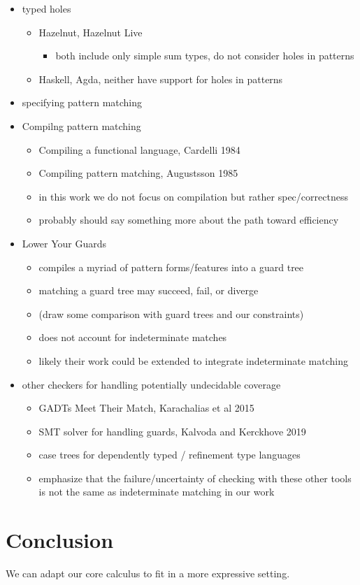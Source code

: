\documentclass[runningheads,envcountsame,a4paper]{llncs}
\begin{document}
\begin{itemize}
    \item typed holes
    \begin{itemize}
        \item Hazelnut, Hazelnut Live
        \begin{itemize}
            \item both include only simple sum types, do not consider holes in patterns
        \end{itemize}
        \item Haskell, Agda, neither have support for holes in patterns
    \end{itemize}
    \item specifying pattern matching
    \item Compilng pattern matching
    \begin{itemize}
        \item Compiling a functional language, Cardelli 1984
        \item Compiling pattern matching, Augustsson 1985
        \item in this work we do not focus on compilation but rather
        spec/correctness
        \item probably should say something more about the path toward
        efficiency
    \end{itemize}
    \item Lower Your Guards
    \begin{itemize}
        \item compiles a myriad of pattern forms/features into a guard tree
        \item matching a guard tree may succeed, fail, or diverge
        \item (draw some comparison with guard trees and our constraints)
        \item does not account for indeterminate matches
        \item likely their work could be extended to integrate indeterminate matching
    \end{itemize}
    \item other checkers for handling potentially undecidable coverage
    \begin{itemize}
        \item GADTs Meet Their Match, Karachalias et al 2015
        \item SMT solver for handling guards, Kalvoda and Kerckhove 2019
        \item case trees for dependently typed / refinement type languages
        \item emphasize that the failure/uncertainty of checking with these
        other tools is not the same as indeterminate matching in our work
    \end{itemize}
\end{itemize}

\section{Conclusion}
We can adapt our core calculus to fit in a more expressive setting.
\clearpage





\end{document}
